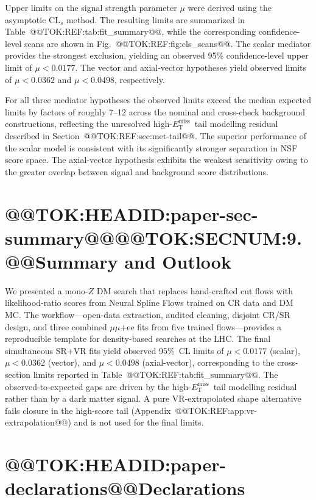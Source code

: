 \documentclass[11pt]{article}
\newcommand{\MET}{\ensuremath{E_{\mathrm{T}}^{\mathrm{miss}}}}
\begin{document}
Upper limits on the signal strength parameter $\mu$ were derived using the
asymptotic $\mathrm{CL}_{s}$ method. The resulting limits are summarized in
Table~@@TOK:REF:tab:fit_summary@@, while the corresponding confidence-level scans
are shown in Fig.~@@TOK:REF:fig:cls_scans@@. The scalar mediator provides the
strongest exclusion, yielding an observed 95\% confidence-level upper limit
of $\mu < 0.0177$. The vector and axial-vector hypotheses yield observed
limits of $\mu < 0.0362$ and $\mu < 0.0498$, respectively.

For all three mediator hypotheses the observed limits exceed the median
expected limits by factors of roughly 7--12 across the nominal and cross-check
background constructions, reflecting the unresolved high-\MET\ tail
modelling residual described in Section~@@TOK:REF:sec:met-tail@@. The superior
performance of the scalar model is consistent with its significantly
stronger separation in NSF score space. The axial-vector hypothesis
exhibits the weakest sensitivity owing to the greater overlap between
signal and background score distributions.

\section{@@TOK:HEADID:paper-sec-summary@@@@TOK:SECNUM:9. @@Summary and Outlook}

We presented a mono-$Z$ DM search that replaces hand-crafted cut flows with
likelihood-ratio scores from Neural Spline Flows trained on CR data and DM MC.
The workflow---open-data extraction, audited cleaning, disjoint CR/SR design, and
three combined $\mu\mu$+ee fits from five trained flows---provides a reproducible
template for density-based searches at the LHC. The final simultaneous SR+VR
fits yield observed 95\%~CL limits of $\mu<0.0177$ (scalar),
$\mu<0.0362$ (vector), and $\mu<0.0498$
(axial-vector), corresponding to the cross-section limits reported in
Table~@@TOK:REF:tab:fit_summary@@. The observed-to-expected gaps are driven by the
high-\MET\ tail modelling residual rather than by a dark matter signal.
A pure VR-extrapolated shape alternative fails closure in the high-score
tail (Appendix~@@TOK:REF:app:vr-extrapolation@@) and is not used for the final limits.


\section*{@@TOK:HEADID:paper-declarations@@Declarations}
\end{document}
